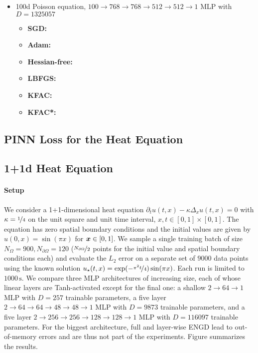 \begin{itemize}
\item 100d Poisson equation, $100 \to 768 \to 768 \to 512 \to 512 \to 1$ MLP with $D=\num{1325057}$
  \begin{itemize}
    \def\pathToRuns{kfac_pinns_exp/exp14_poisson_100d_weinan/tex}
  \item \textbf{SGD:} 
  \item \textbf{Adam:} 
  \item \textbf{Hessian-free:} 
  \item \textbf{LBFGS:} 
  \item \textbf{KFAC:} 
  \item \textbf{KFAC*:} 
  \end{itemize}
\end{itemize}

\subsection{PINN Loss for the Heat Equation}\label{sec:pinn-loss-heat-equation}


\subsection{1+1d Heat Equation}\label{sec:1d-heat-equation}

\paragraph{Setup} We consider a 1+1-dimensional heat equation $\partial_tu(t,x) - \kappa \Delta_{x} u(t, x) = 0$ with $\kappa = \nicefrac{1}{4}$ on the unit square and unit time interval, $x, t \in [0,1] \times [0,1]$.
The equation has zero spatial boundary conditions and the initial values are given by $u(0, x) = \sin(\pi x)$ for ${\bm{x}} \in [0,1]$.
We sample a single training batch of size $N_{\Omega} = \num{900}, N_{\partial\Omega} = 120$ ($\nicefrac{N_{\partial\Omega}}{2}$ points for the initial value and spatial boundary conditions each) and evaluate the $L_2$ error on a separate set of $\num{9000}$ data points using the known solution $u_{\star}(t, x) = \exp(-\nicefrac{\pi^2t}{4}) \sin(\pi x)$.
Each run is limited to $\num{1000}\,\text{s}$. We compare three MLP architectures of increasing size, each of whose linear layers are Tanh-activated except for the final one: a shallow $2\to 64\to 1$ MLP with $D=257$ trainable parameters, a five layer $2 \to 64 \to 64 \to 48 \to 48 \to 1$ MLP with $D=\num{9873}$ trainable parameters, and a five layer $2 \to 256 \to 256\to 128 \to 128 \to 1$ MLP with $D=\num{116097}$ trainable parameters.
For the biggest architecture, full and layer-wise ENGD lead to out-of-memory errors and are thus not part of the experiments.
Figure  summarizes the results.

